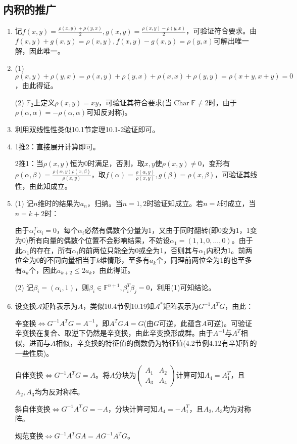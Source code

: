 \documentclass[a4paper,UTF8,fontset=windows]{ctexart}
\DeclareMathOperator{\Char}{Char}
\begin{document}
\subsection{内积的推广}
\begin{enumerate}
\item
记$f(x,y)=\frac{\rho(x,y)+\rho(y,x)}{2},g(x,y)=\frac{\rho(x,y)-\rho(y,x)}{2}$，可验证符合要求。由$f(x,y)+g(x,y)=\rho(x,y),f(x,y)-g(x,y)=\rho(y,x)$可解出唯一解，因此唯一。

\item
(1) $\rho(x,y)+\rho(y,x)=\rho(x,y)+\rho(y,x)+\rho(x,x)+\rho(y,y)=\rho(x+y,x+y)=0$，由此得证。

(2) $\mathbb{F}_2$上定义$\rho(x,y)=xy$，可验证其符合要求(当$\Char\mathbb{F}\ne2$时，由于$\rho(\alpha,\alpha)=-\rho(\alpha,\alpha)$可知反对称)。

\item
利用双线性性类似10.1节定理10.1-2验证即可。

\item
1推2：直接展开计算即可。

2推1：当$\rho(x,y)$恒为0时满足，否则，取$x,y$使$\rho(x,y)\ne0$，变形有$\rho(\alpha,\beta)=\frac{\rho(\alpha,y)\rho(x,\beta)}{\rho(x,y)}$，取$f(\alpha)=\frac{\rho(\alpha,y)}{\rho(x,y)},g(\beta)=\rho(x,\beta)$，可验证其线性，由此知成立。

\item
(1) 记$n$维时的结果为$a_n$，归纳。当$n=1,2$时验证知成立。若$n=k$时成立，当$n=k+2$时：

由于$\alpha_i^T\alpha_i=0$，每个$\alpha_i$必然有偶数个分量为1，又由于同时翻转(即0变为1，1变为0)所有向量的偶数个位置不会影响结果，不妨设$\alpha_1=(1,1,0,\dots,0)$。由于此$\alpha_1$的存在，所有$\alpha_i$的前两位只能全为0或全为1，否则其与$\alpha_1$内积为1。前两位全为0的不同向量相当于$k$维情形，至多有$a_k$个，同理前两位全为1的也至多有$a_k$个，因此$a_{k+2}\le2a_k$，由此得证。

(2) 记$\beta_i=(\alpha_i,1)$，则$\beta_i\in\mathbb{F}^{n+1},\beta_i^T\beta_j=0$，利用(1)可知结论。

\item
设变换$\mathcal{A}$矩阵表示为$A$，类似10.4节例10.19知$\mathcal{A}^*$矩阵表示为$G^{-1}A^TG$，由此：

辛变换$\Leftrightarrow G^{-1}A^TG=A^{-1}$，即$A^TGA=G$(由$G$可逆，此蕴含$A$可逆)。可验证辛变换在复合、取逆下仍然是辛变换，由此辛变换形成群。由于$A^{-1}$与$A^T$相似，进而与$A$相似，辛变换的特征值的倒数仍为特征值(4.2节例4.12有辛矩阵的一些性质)。

自伴变换$\Leftrightarrow G^{-1}A^TG=A$。将$A$分块为$\begin{pmatrix}A_1&A_2\\A_3&A_4\end{pmatrix}$计算可知$A_4=A_1^T$，且$A_2,A_3$均为反对称阵。

斜自伴变换$\Leftrightarrow G^{-1}A^TG=-A$，分块计算可知$A_4=-A_1^T$，且$A_2,A_3$均为对称阵。

规范变换$\Leftrightarrow G^{-1}A^TGA=AG^{-1}A^TG$。
\end{enumerate}
\end{document}
